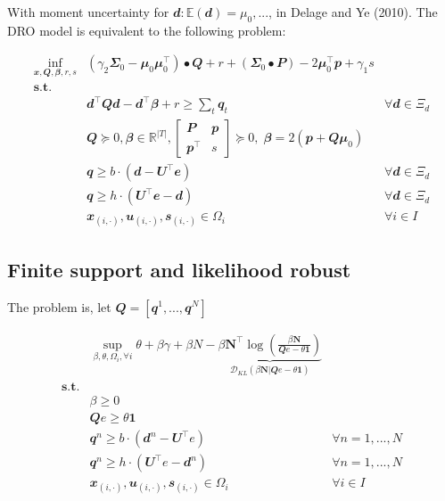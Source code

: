 \documentclass[
  a4paper,
,tablecaptionabove
]{scrartcl}
\numberwithin{equation}{section}
\begin{document}
With moment uncertainty for
\(\mathbfit d: \mathbb{E}(\mathbfit d) = \mu_0, ...\), in Delage and
Ye (2010). The DRO model is equivalent to the following problem:

\[\begin{aligned}
\inf_{\mathbfit{x}, \mathbfit{Q}, \mathbfit{\beta}, r, s} & \left(\gamma_{2} \mathbfit{\Sigma}_{0}-\mathbfit{\mu}_{0} \mathbfit{\mu}_{0}^{\top}\right) \bullet \mathbfit{Q}+r+\left(\mathbfit{\Sigma}_{0} \bullet \mathbfit{P}\right)-2 \mathbfit{\mu}_{0}^{\top} \mathbfit{p} + \gamma_{1} s \\
\mathbf { s.t. } & \\
& \mathbfit{d}^{\top} \mathbfit{Q} \mathbfit{d} -\mathbfit{d^\top\beta} + r \ge \sum_t \mathbfit q_t & \forall \mathbfit d \in \Xi_d \\
& \mathbfit{Q} \succeq 0, \mathbfit{\beta} \in \mathbb{R}^{|T|}, 
\begin{bmatrix}
  \mathbfit{P} & \mathbfit{p} \\
  \mathbfit{p}^\top & s
\end{bmatrix} \succeq 0, \; 
\mathbfit \beta = 2 (\mathbfit p + \mathbfit{Q\mu}_0)\\
& \mathbfit q \ge b\cdot \left (\mathbfit d - \mathbfit U^\top \mathbfit{e} \right) & \forall \mathbfit d \in \Xi_d\\
  & \mathbfit q \ge h\cdot \left ( \mathbfit U^\top \mathbfit{e}  - \mathbfit d \right ) & \forall \mathbfit d \in \Xi_d \\
& \mathbfit x_{(i,\cdot)}, \mathbfit u_{(i,\cdot)}, \mathbfit s_{(i,\cdot)} \in \Omega_i & \forall i\in I
\end{aligned}\]

\hypertarget{finite-support-and-likelihood-robust}{%
\subsection{Finite support and likelihood
robust}\label{finite-support-and-likelihood-robust}}

The problem is, let
\(\mathbfit Q = [\mathbfit{q}^1, ..., \mathbfit{q}^N]\)

\[\begin{aligned}
  & \sup_{\beta, \theta, \Omega_i, \forall i} \theta + \beta \gamma +  \beta N - \underbrace{\beta \mathbf N^\top \log(\frac{\beta \mathbf N}{\mathbfit{Q} e-\theta \mathbf 1})}_{\mathcal D_{KL}(\beta \mathbf N | \mathbfit{Q} e-\theta \mathbf 1)}  \\
  \textbf {s.t.} \\
  & \beta \ge 0 \\
  & \mathbfit{Q} e \ge \theta \mathbf 1 \\ 
  & \mathbfit q^n \ge b\cdot \left (\mathbfit d^n - \mathbfit{U}^\top e \right) & \forall n = 1, ..., N\\
  & \mathbfit q^n \ge h\cdot \left ( \mathbfit{U}^\top e  -\mathbfit d^n  \right ) & \forall n = 1, ..., N \\
  & \mathbfit x_{(i,\cdot)}, \mathbfit u_{(i,\cdot)}, \mathbfit s_{(i,\cdot)} \in \Omega_i & \forall i\in I
\end{aligned}\]
\end{document}
